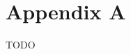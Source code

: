\documentclass{article}
\theoremstyle{plain}
\theoremstyle{definition}
\theoremstyle{remark}
\begin{document}













\newpage
\appendix
\onecolumn
\section{Appendix A}

TODO
\end{document}
